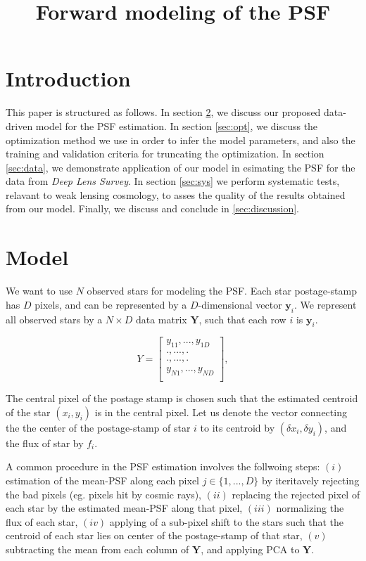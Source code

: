 \documentclass[12pt,preprint]{aastex}
\newcommand{\beq}{\begin{equation}}
\newcommand{\eeq}{\end{equation}}
\begin{document}
\title{Forward modeling of the PSF}
\section{Introduction}

This paper is structured as follows. In section \ref{sec:model},
we discuss our proposed data-driven model for the PSF estimation.
In section \ref{sec:opt}, we discuss the optimization method
 we use in order to infer the model parameters, and also
 the training and validation criteria for 
truncating the optimization. In section \ref{sec:data},
 we demonstrate application of our model in esimating
 the PSF for the data from \emph{Deep Lens Survey}. 
In section \ref{sec:sys} we perform systematic tests,
 relavant to weak lensing cosmology, 
to asses the quality of the results obtained from our model. 
Finally, we discuss and conclude in \ref{sec:discussion}.               

\section{Model}\label{sec:model}

We want to use $N$ observed stars for modeling the PSF. 
Each star postage-stamp has $D$ pixels, 
and can be represented by a $D$-dimensional vector 
$\mathbf{y}_{i}$. We represent all observed stars by a 
$N\times D$ data matrix $\mathbf{Y}$, such that each row $i$ 
is $\mathbf{y}_{i}$.

\beq
Y=
  \begin{bmatrix}
    y_{11}, ... , y_{1D} \\
    ., ... , . \\
    ., ... , . \\
    y_{N1}, ... , y_{ND} \\
  \end{bmatrix},
\eeq

The central pixel of 
the postage stamp is chosen such that the estimated centroid
of the star $(x_i , y_i)$ is in the central pixel. 
Let us denote the vector connecting the the center of the 
postage-stamp of star $i$ to its centroid by $(\delta x_{i},
\delta y_{i})$, and the flux of star by $f_{i}$. 
  
A common procedure in the PSF estimation involves the follwoing steps:
$(i)$ estimation of the mean-PSF along each pixel $j\in\{1,...,D\}$
by iteritavely rejecting the bad pixels (eg. pixels hit by cosmic rays),
 $(ii)$ replacing the rejected pixel of each star by the estimated mean-PSF 
along that pixel, $(iii)$ normalizing the flux of each star,
 $(iv)$ applying of a sub-pixel shift
to the stars such that the centroid of each star lies on center 
of the postage-stamp of that star, $(v)$ subtracting the mean from each
column of $\mathbf{Y}$, and applying PCA to $\mathbf{Y}$.
\end{document}
